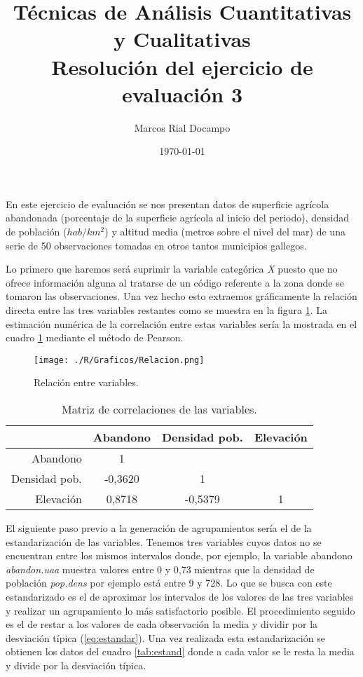 \documentclass[11pt,a4paper]{article}
\author{Marcos Rial Docampo}
\title{Técnicas de Análisis Cuantitativas y Cualitativas\\Resolución del ejercicio de evaluación 3}
\date{\small{\today}}
\begin{document}
\maketitle

En este ejercicio de evaluación se nos presentan datos de superficie agrícola abandonada (porcentaje de la superficie agrícola al inicio del periodo), densidad de población ($hab/km^{2}$) y altitud media (metros sobre el nivel del mar) de una serie de 50 observaciones tomadas en otros tantos municipios gallegos.

Lo primero que haremos será suprimir la variable categórica \textit{X} puesto que no ofrece información alguna al tratarse de un código referente a la zona donde se tomaron las observaciones. Una vez hecho esto extraemos gráficamente la relación directa entre las tres variables restantes como se muestra en la figura \ref{fig:relacion}. La estimación numérica de la correlación entre estas variables sería la mostrada en el cuadro \ref{tab:matrizcor} mediante el método de Pearson.

\begin{figure}
	\centering
	\texttt{[image: ./R/Graficos/Relacion.png]}
	\caption{Relación entre variables.}
	\label{fig:relacion}
\end{figure}

\begin{table}[ht]
\centering
\begin{tabular}{rccc}
\toprule[0.4mm]
 & Abandono & Densidad pob. & Elevación\\
\midrule
Abandono & 1 & & \\
Densidad pob. & -0,3620 & 1 & \\
Elevación & 0,8718 & -0,5379 & 1\\
\bottomrule[0.4mm]
\end{tabular}
\caption{Matriz de correlaciones de las variables.}
\label{tab:matrizcor}
\end{table}

El siguiente paso previo a la generación de agrupamientos sería el de la estandarización de las variables. Tenemos tres variables cuyos datos no se encuentran entre los mismos intervalos donde, por ejemplo, la variable abandono \textit{abandon.uaa} muestra valores entre 0 y 0,73 mientras que la densidad de población \textit{pop.dens} por ejemplo está entre 9 y 728. Lo que se busca con este estandarizado es el de aproximar los intervalos de los valores de las tres variables y realizar un agrupamiento lo más satisfactorio posible. El procedimiento seguido es el de restar a los valores de cada observación la media y dividir por la desviación típica (\ref{eq:estandar}). Una vez realizada esta estandarización se obtienen los datos del cuadro \ref{tab:estand} donde a cada valor se le resta la media y divide por la desviación típica.
\end{document}
